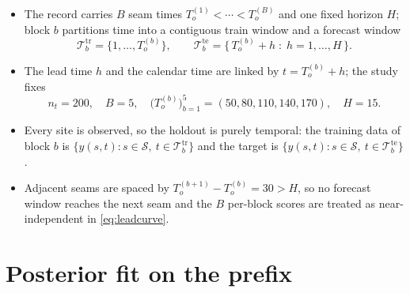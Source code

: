 \documentclass[11pt]{article}
\begin{document}
\begin{itemize}[leftmargin=1.4em]
  \item The record carries $B$ seam times
        $T_o^{(1)}<\cdots<T_o^{(B)}$ and one fixed horizon $H$; block
        $b$ partitions time into a contiguous train window and a
        forecast window
        \begin{equation}
          \mathcal T_b^{\mathrm{tr}}
            = \{1,\dots,T_o^{(b)}\},
          \qquad
          \mathcal T_b^{\mathrm{te}}
            = \big\{\,T_o^{(b)}+h \;:\; h=1,\dots,H \,\big\}.
          \label{eq:windows}
        \end{equation}
  \item The lead time $h$ and the calendar time are linked by
        $t = T_o^{(b)}+h$; the study fixes
        \begin{equation}
          n_t = 200,\quad B = 5,\quad
          \big(T_o^{(b)}\big)_{b=1}^{5} = (50,80,110,140,170),\quad
          H = 15 .
          \label{eq:constants}
        \end{equation}
  \item Every site is observed, so the holdout is purely temporal: the
        training data of block $b$ is
        $\{y(s,t):s\in\mathcal S,\ t\in\mathcal T_b^{\mathrm{tr}}\}$ and
        the target is
        $\{y(s,t):s\in\mathcal S,\ t\in\mathcal T_b^{\mathrm{te}}\}$.
  \item Adjacent seams are spaced by
        $T_o^{(b+1)}-T_o^{(b)} = 30 > H$, so no forecast window reaches
        the next seam and the $B$ per-block scores are treated as
        near-independent in \eqref{eq:leadcurve}.
\end{itemize}

\section{Posterior fit on the prefix}
\end{document}
